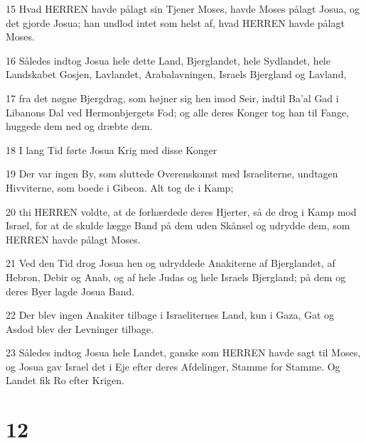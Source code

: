 \par 15 Hvad HERREN havde pålagt sin Tjener Moses, havde Moses pålagt Josua, og det gjorde Josua; han undlod intet som helst af, hvad HERREN havde pålagt Moses.
\par 16 Således indtog Josua hele dette Land, Bjerglandet, hele Sydlandet, hele Landskabet Gosjen, Lavlandet, Arabalavningen, Israels Bjergland og Lavland,
\par 17 fra det nøgne Bjergdrag, som højner sig hen imod Seir, indtil Ba'al Gad i Libanons Dal ved Hermonbjergets Fod; og alle deres Konger tog han til Fange, huggede dem ned og dræbte dem.
\par 18 I lang Tid førte Josua Krig med disse Konger
\par 19 Der var ingen By, som sluttede Overenskomst med Israeliterne, undtagen Hivviterne, som boede i Gibeon. Alt tog de i Kamp;
\par 20 thi HERREN voldte, at de forhærdede deres Hjerter, så de drog i Kamp mod Israel, for at de skulde lægge Band på dem uden Skånsel og udrydde dem, som HERREN havde pålagt Moses.
\par 21 Ved den Tid drog Josua hen og udryddede Anakiterne af Bjerglandet, af Hebron, Debir og Anab, og af hele Judas og hele Israels Bjergland; på dem og deres Byer lagde Josua Band.
\par 22 Der blev ingen Anakiter tilbage i Israeliternes Land, kun i Gaza, Gat og Asdod blev der Levninger tilbage.
\par 23 Således indtog Josua hele Landet, ganske som HERREN havde sagt til Moses, og Josua gav Israel det i Eje efter deres Afdelinger, Stamme for Stamme. Og Landet fik Ro efter Krigen.

\chapter{12}

